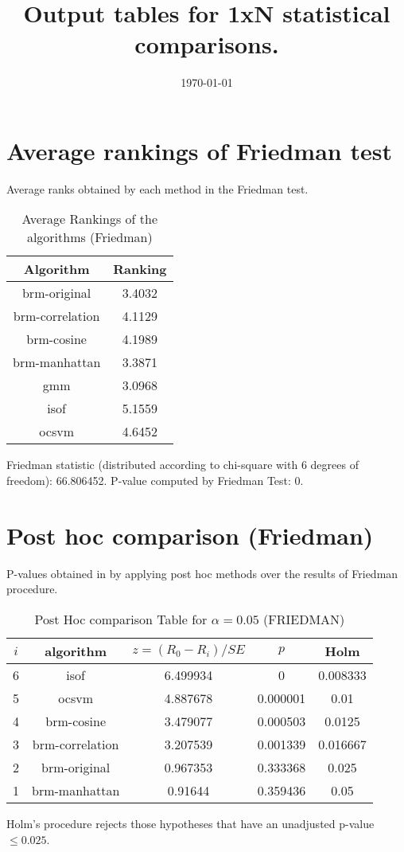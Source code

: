 \documentclass[a4paper,10pt]{article}
\title{Output tables for 1xN statistical comparisons.}
\author{}
\date{\today}
\begin{document}
\begin{landscape}
\pagestyle{empty}
\maketitle
\thispagestyle{empty}

\section{Average rankings of Friedman test}


Average ranks obtained by each method in the Friedman test.

\begin{table}[!htp]
\centering
\begin{tabular}{|c|c|}\hline
Algorithm&Ranking\\\hline
brm-original&3.4032\\brm-correlation&4.1129\\brm-cosine&4.1989\\brm-manhattan&3.3871\\gmm&3.0968\\isof&5.1559\\ocsvm&4.6452\\\hline\end{tabular}
\caption{Average Rankings of the algorithms (Friedman)}
\end{table}

Friedman statistic (distributed according to chi-square with 6 degrees of freedom): 66.806452. \newline P-value computed by Friedman Test: 0.\newline


\newpage

\section{Post hoc comparison (Friedman)}


P-values obtained in by applying post hoc methods over the results of Friedman procedure.

\begin{table}[!htp]
\centering\footnotesize
\begin{tabular}{ccccc}
$i$&algorithm&$z=(R_0 - R_i)/SE$&$p$&Holm \\
\hline6&isof&6.499934&0&0.008333\\5&ocsvm&4.887678&0.000001&0.01\\4&brm-cosine&3.479077&0.000503&0.0125\\3&brm-correlation&3.207539&0.001339&0.016667\\2&brm-original&0.967353&0.333368&0.025\\1&brm-manhattan&0.91644&0.359436&0.05\\\hline
\end{tabular}
\caption{Post Hoc comparison Table for $\alpha=0.05$ (FRIEDMAN)}
\end{table}Holm's procedure rejects those hypotheses that have an unadjusted p-value $\le0.025$.



\end{landscape}
\end{document}
